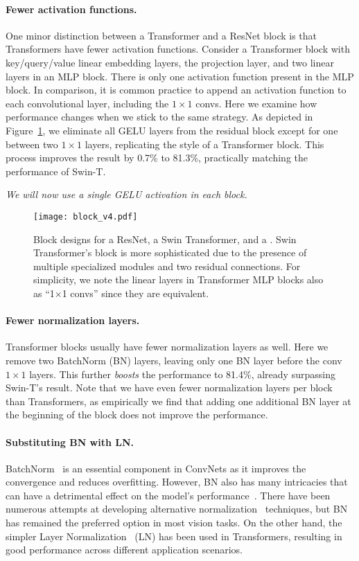 \paragraph{Fewer activation functions.}
One minor distinction between a Transformer and a ResNet block is that Transformers have fewer activation functions. Consider a Transformer block with key/query/value linear embedding layers, the projection layer, and two linear layers in an MLP block. There is only one activation function present in the MLP block. In comparison, it is common practice to append an activation function to each convolutional layer, including the $1\times1$ convs. Here we examine how performance changes when we stick to the same strategy. As depicted in Figure~\ref{fig:block}, we eliminate all GELU layers from the residual block except for one between two $1\times1$ layers, replicating the style of a Transformer block. This process improves the result by 0.7\% to 81.3\%, practically matching the performance of Swin-T. 


\textit{We will now use a single GELU activation in each block.}

\begin{figure}[t]
\centering
\texttt{[image: block\_v4.pdf]}
\caption{Block designs for a ResNet, a Swin Transformer, and a \cnn. Swin Transformer's block is more sophisticated due to the presence of multiple specialized modules and two residual connections. For simplicity, we note the linear layers in Transformer MLP blocks also as ``1$\times$1 convs'' since they are equivalent.}
\label{fig:block}
\end{figure}

\paragraph{Fewer normalization layers.}
Transformer blocks usually have fewer normalization layers as well. Here we remove two BatchNorm (BN) layers, leaving only one BN layer before the conv $1\times1$ layers. This further \textit{boosts} the performance to 81.4\%, already surpassing Swin-T's result. Note that we have even fewer normalization layers per block than Transformers, as empirically we find that adding one additional BN layer at the beginning of the block does not improve the performance. 

\paragraph{Substituting BN with LN.}
BatchNorm~\cite{Ioffe2017} is an essential component in ConvNets as it improves the convergence and reduces overfitting. However, BN also has many intricacies that can have a detrimental effect on the model's performance~\cite{wu2021rethinking}. There have been numerous attempts at developing alternative normalization~\cite{Salimans2016,Ulyanov2016,Wu2018} techniques, but BN has remained the preferred option in most vision tasks.
On the other hand, the simpler Layer Normalization~\cite{Ba2016} (LN) has been used in Transformers, resulting in good performance across different application scenarios.


